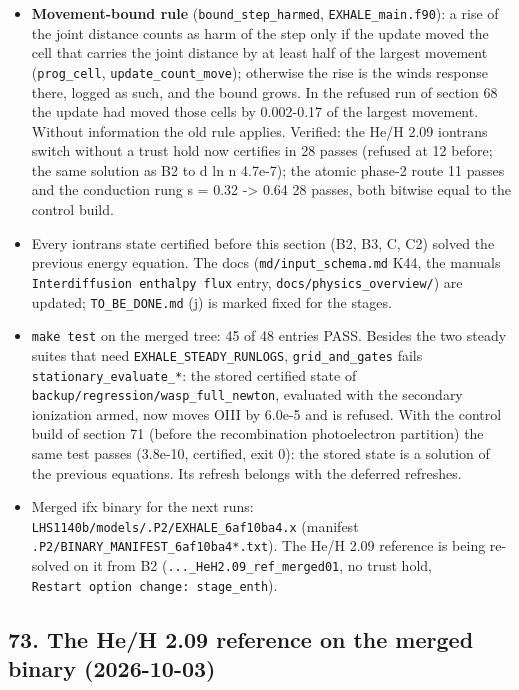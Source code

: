 \documentclass[english,a4paper]{my_memo}
\begin{document}
\begin{itemize}
  7.80532 -\textgreater{} 7.80523; EW solution 0.5829 (was 0.5830), advected 0.5679.
\item
  \textbf{Movement-bound rule} (\texttt{bound\_step\_harmed}, \texttt{EXHALE\_main.f90}): a rise
  of the joint distance counts as harm of the step only if the update moved
  the cell that carries the joint distance by at least half of the largest
  movement (\texttt{prog\_cell}, \texttt{update\_count\_move}); otherwise the rise is the
  wind\textquotesingle s response there, logged as such, and the bound grows. In the refused
  run of section 68 the update had moved those cells by 0.002-0.17 of the
  largest movement. Without information the old rule applies. Verified:
  the He/H 2.09 iontrans switch without a trust hold now certifies in 28
  passes (refused at 12 before; the same solution as B2 to \textbar d ln n\textbar{} 4.7e-7);
  the atomic phase-2 route 11 passes and the conduction rung s = 0.32 -\textgreater{}
  0.64 28 passes, both bitwise equal to the control build.
\item
  Every iontrans state certified before this section (B2, B3, C, C2) solved
  the previous energy equation. The docs (\texttt{md/input\_schema.md} K44, the
  manual\textquotesingle s \texttt{Interdiffusion\ enthalpy\ flux} entry, \texttt{docs/physics\_overview/})
  are updated; \texttt{TO\_BE\_DONE.md} (j) is marked fixed for the stages.
\item
  \texttt{make\ test} on the merged tree: 45 of 48 entries PASS. Besides the two
  steady suites that need \texttt{EXHALE\_STEADY\_RUNLOGS}, \texttt{grid\_and\_gates} fails
  \texttt{stationary\_evaluate\_*}: the stored certified state of
  \texttt{backup/regression/wasp\_full\_newton}, evaluated with the secondary
  ionization armed, now moves OIII by 6.0e-5 and is refused. With the
  control build of section 71 (before the recombination photoelectron
  partition) the same test passes (3.8e-10, certified, exit 0): the stored
  state is a solution of the previous equations. Its refresh belongs with
  the deferred refreshes.
\item
  Merged ifx binary for the next runs: \texttt{LHS1140b/models/.P2/EXHALE\_6af10ba4.x}
  (manifest \texttt{.P2/BINARY\_MANIFEST\_6af10ba4*.txt}). The He/H 2.09 reference
  is being re-solved on it from B2 (\texttt{...\_HeH2.09\_ref\_merged01}, no trust
  hold, \texttt{Restart\ option\ change:\ stage\_enth}).
\end{itemize}

\subsection{73. The He/H 2.09 reference on the merged binary (2026-10-03)}\label{73-the-heh-209-reference-on-the-merged-binary-2026-10-03}
\end{document}
